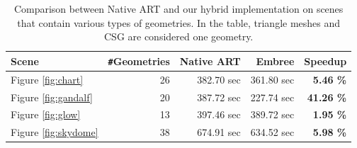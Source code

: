 \begin{table}
	\centering
	{\footnotesize\sf
		\begin{tabular}{lrrrr}
			\toprule
			Scene & \Verb!#!Geometries & Native ART & Embree & Speedup \\ 
			\midrule
			Figure \ref{fig:chart} & 26 & 382.70 sec & 361.80 sec & \textbf{5.46 \%} \\
			Figure \ref{fig:gandalf} & 20 & 387.72 sec & 227.74 sec & \textbf{41.26 \%} \\
			Figure \ref{fig:glow} & 13 & 397.46 sec & 389.72 sec & \textbf{1.95 \%}  \\
			Figure \ref{fig:skydome} & 38 & 674.91 sec & 634.52 sec & \textbf{5.98 \%} \\
			\bottomrule
	\end{tabular}}
	\caption{Comparison between Native ART and our hybrid implementation on scenes that contain various types of geometries. In the table, triangle meshes and CSG are considered one geometry.}
	\label{tab:scenes}
\end{table}



